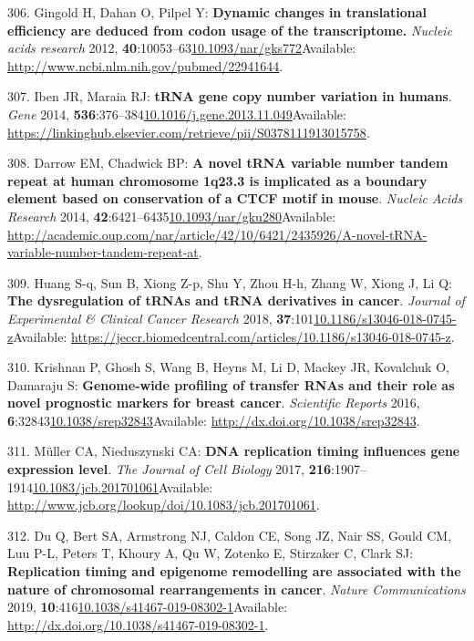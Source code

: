 \documentclass[
]{book}
\begin{document}
\leavevmode\hypertarget{ref-Gingold2012}{}%
306. Gingold H, Dahan O, Pilpel Y: \textbf{Dynamic changes in translational efficiency are deduced from codon usage of the transcriptome.} \emph{Nucleic acids research} 2012, \textbf{40}:10053--63\href{https://doi.org/10.1093/nar/gks772}{10.1093/nar/gks772}Available: \url{http://www.ncbi.nlm.nih.gov/pubmed/22941644}.

\leavevmode\hypertarget{ref-Iben2015}{}%
307. Iben JR, Maraia RJ: \textbf{tRNA gene copy number variation in humans}. \emph{Gene} 2014, \textbf{536}:376--384\href{https://doi.org/10.1016/j.gene.2013.11.049}{10.1016/j.gene.2013.11.049}Available: \url{https://linkinghub.elsevier.com/retrieve/pii/S0378111913015758}.

\leavevmode\hypertarget{ref-Darrow2014}{}%
308. Darrow EM, Chadwick BP: \textbf{A novel tRNA variable number tandem repeat at human chromosome 1q23.3 is implicated as a boundary element based on conservation of a CTCF motif in mouse}. \emph{Nucleic Acids Research} 2014, \textbf{42}:6421--6435\href{https://doi.org/10.1093/nar/gku280}{10.1093/nar/gku280}Available: \url{http://academic.oup.com/nar/article/42/10/6421/2435926/A-novel-tRNA-variable-number-tandem-repeat-at}.

\leavevmode\hypertarget{ref-Huang2018}{}%
309. Huang S-q, Sun B, Xiong Z-p, Shu Y, Zhou H-h, Zhang W, Xiong J, Li Q: \textbf{The dysregulation of tRNAs and tRNA derivatives in cancer}. \emph{Journal of Experimental \& Clinical Cancer Research} 2018, \textbf{37}:101\href{https://doi.org/10.1186/s13046-018-0745-z}{10.1186/s13046-018-0745-z}Available: \url{https://jeccr.biomedcentral.com/articles/10.1186/s13046-018-0745-z}.

\leavevmode\hypertarget{ref-Krishnan2016}{}%
310. Krishnan P, Ghosh S, Wang B, Heyns M, Li D, Mackey JR, Kovalchuk O, Damaraju S: \textbf{Genome-wide profiling of transfer RNAs and their role as novel prognostic markers for breast cancer}. \emph{Scientific Reports} 2016, \textbf{6}:32843\href{https://doi.org/10.1038/srep32843}{10.1038/srep32843}Available: \url{http://dx.doi.org/10.1038/srep32843}.

\leavevmode\hypertarget{ref-Muller2017}{}%
311. Müller CA, Nieduszynski CA: \textbf{DNA replication timing influences gene expression level}. \emph{The Journal of Cell Biology} 2017, \textbf{216}:1907--1914\href{https://doi.org/10.1083/jcb.201701061}{10.1083/jcb.201701061}Available: \url{http://www.jcb.org/lookup/doi/10.1083/jcb.201701061}.

\leavevmode\hypertarget{ref-Du2019}{}%
312. Du Q, Bert SA, Armstrong NJ, Caldon CE, Song JZ, Nair SS, Gould CM, Luu P-L, Peters T, Khoury A, Qu W, Zotenko E, Stirzaker C, Clark SJ: \textbf{Replication timing and epigenome remodelling are associated with the nature of chromosomal rearrangements in cancer}. \emph{Nature Communications} 2019, \textbf{10}:416\href{https://doi.org/10.1038/s41467-019-08302-1}{10.1038/s41467-019-08302-1}Available: \url{http://dx.doi.org/10.1038/s41467-019-08302-1}.
\end{document}
